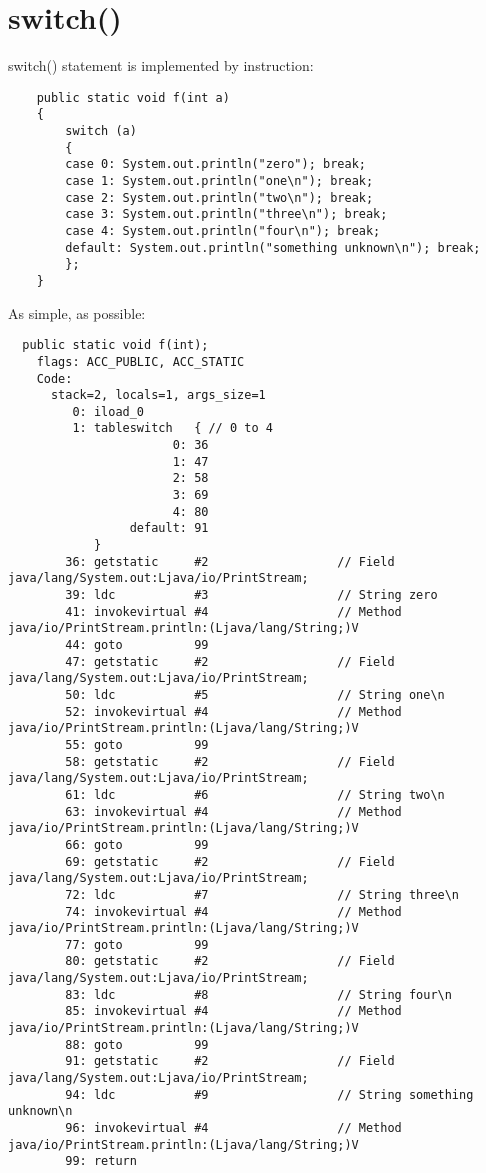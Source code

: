 \section{switch()}

switch() statement is implemented by  instruction:

\begin{lstlisting}
	public static void f(int a)
	{
		switch (a)
		{
		case 0: System.out.println("zero"); break;
		case 1: System.out.println("one\n"); break;
		case 2: System.out.println("two\n"); break;
		case 3: System.out.println("three\n"); break;
		case 4: System.out.println("four\n"); break;
		default: System.out.println("something unknown\n"); break;
		};
	}
\end{lstlisting}

As simple, as possible:

\begin{lstlisting}
  public static void f(int);
    flags: ACC_PUBLIC, ACC_STATIC
    Code:
      stack=2, locals=1, args_size=1
         0: iload_0       
         1: tableswitch   { // 0 to 4
                       0: 36
                       1: 47
                       2: 58
                       3: 69
                       4: 80
                 default: 91
            }
        36: getstatic     #2                  // Field java/lang/System.out:Ljava/io/PrintStream;
        39: ldc           #3                  // String zero
        41: invokevirtual #4                  // Method java/io/PrintStream.println:(Ljava/lang/String;)V
        44: goto          99
        47: getstatic     #2                  // Field java/lang/System.out:Ljava/io/PrintStream;
        50: ldc           #5                  // String one\n
        52: invokevirtual #4                  // Method java/io/PrintStream.println:(Ljava/lang/String;)V
        55: goto          99
        58: getstatic     #2                  // Field java/lang/System.out:Ljava/io/PrintStream;
        61: ldc           #6                  // String two\n
        63: invokevirtual #4                  // Method java/io/PrintStream.println:(Ljava/lang/String;)V
        66: goto          99
        69: getstatic     #2                  // Field java/lang/System.out:Ljava/io/PrintStream;
        72: ldc           #7                  // String three\n
        74: invokevirtual #4                  // Method java/io/PrintStream.println:(Ljava/lang/String;)V
        77: goto          99
        80: getstatic     #2                  // Field java/lang/System.out:Ljava/io/PrintStream;
        83: ldc           #8                  // String four\n
        85: invokevirtual #4                  // Method java/io/PrintStream.println:(Ljava/lang/String;)V
        88: goto          99
        91: getstatic     #2                  // Field java/lang/System.out:Ljava/io/PrintStream;
        94: ldc           #9                  // String something unknown\n
        96: invokevirtual #4                  // Method java/io/PrintStream.println:(Ljava/lang/String;)V
        99: return        
\end{lstlisting}
